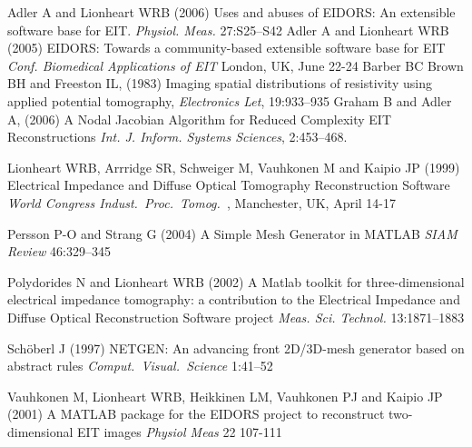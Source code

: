 \documentclass[letterpaper,twocolumn,10pt]{article}
\begin{document}
\begin{thebibliography}{1}
\setlength{\parskip}{0ex}%
\setlength{\itemsep}{0ex}%
\small%
%
Adler A and
Lionheart WRB
(2006)
Uses and abuses of EIDORS: An extensible software base for EIT.
\emph{Physiol. Meas.}
27:S25--S42
%
Adler A and
Lionheart WRB
(2005)
EIDORS: Towards a community-based extensible software base for EIT
{\em Conf. Biomedical Applications of EIT}
London, UK, June 22-24
%
Barber BC
Brown BH and
Freeston IL,
(1983)
Imaging spatial distributions of resistivity using
applied potential tomography,
{\em Electronics Let},
19:933--935
%
Graham B and Adler A,
(2006)
A Nodal Jacobian Algorithm for Reduced Complexity EIT Reconstructions
{\em Int. J. Inform. Systems Sciences},
2:453--468.

Lionheart WRB,
Arrridge SR,
Schweiger M,
Vauhkonen M and
Kaipio JP
(1999)
Electrical Impedance and Diffuse Optical Tomography
Reconstruction Software
{\em World Congress Indust.\ Proc.\ Tomog.\ },
Manchester, UK, April 14-17

Persson P-O and
Strang G
(2004)
A Simple Mesh Generator in MATLAB
{\em SIAM Review}
46:329--345

Polydorides N and
Lionheart  WRB
(2002)
A Matlab toolkit for three-dimensional electrical impedance tomography:
a contribution to the Electrical Impedance and Diffuse Optical
Reconstruction Software project
{\em Meas. Sci. Technol.}
13:1871--1883 

Sch\"oberl J
(1997)
NETGEN: An advancing front 2D/3D-mesh generator based on
abstract rules
{\em Comput.\ Visual.\ Science}
1:41--52

Vauhkonen M,
Lionheart WRB,
Heikkinen LM,
Vauhkonen PJ and
Kaipio JP
(2001)
A MATLAB package for the EIDORS project to reconstruct two-dimensional EIT 
images
{\em Physiol Meas}
22 107-111

\end{thebibliography}
\end{document}
